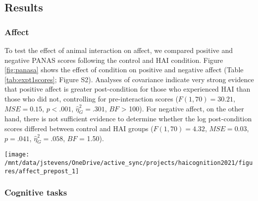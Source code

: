 \documentclass[
  english,
  pub,floatsintext]{apa6}
\begin{document}
\hypertarget{results}{%
\subsection{Results}\label{results}}

\hypertarget{affect}{%
\subsubsection{Affect}\label{affect}}

To test the effect of animal interaction on affect, we compared positive and negative PANAS scores following the control and HAI condition. Figure \ref{fig:panasa} shows the effect of condition on positive and negative affect (Table \ref{tab:expt1scores}; Figure S2). Analyses of covariance indicate very strong evidence that positive affect is greater post-condition for those who experienced HAI than those who did not, controlling for pre-interaction scores (\(F(1, 70) = 30.21\), \(\mathit{MSE} = 0.15\), \(p < .001\), \(\hat{\eta}^2_G = .301\), \(BF\) \textgreater{} 100). For negative affect, on the other hand, there is not sufficient evidence to determine whether the log post-condition scores differed between control and HAI groups (\(F(1, 70) = 4.32\), \(\mathit{MSE} = 0.03\), \(p = .041\), \(\hat{\eta}^2_G = .058\), \(BF\) = 1.50).



\begin{figure*}
\texttt{[image: /mnt/data/jstevens/OneDrive/active\_sync/projects/haicognition2021/figures/affect\_prepost\_1]} \caption{Affect scores pre- and post-condition for control and HAI (human-animal interaction) groups in Experiment 1. Scores show (a) positive PANAS ratings and (b) negative PANAS ratings. Open triangles (blue) represent individual control participant scores, open circles (orange) represent individual HAI participant scores, closed triangles and circles represent condition group means (with lines connecting condition means), error bars represent 95\% confidence intervals.}\label{fig:panasa}
\end{figure*}

\hypertarget{cognitive-tasks}{%
\subsubsection{Cognitive tasks}\label{cognitive-tasks}}
\end{document}
